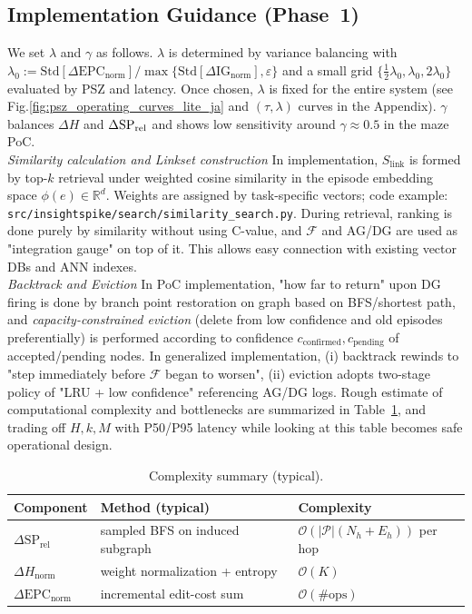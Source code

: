\documentclass[12pt]{article}
\newcommand{\F}{\mathcal{F}}
\newcommand{\gednorm}{\Delta\mathrm{EPC}_{\mathrm{norm}}}
\newcommand{\ignorm}{\Delta\mathrm{IG}_{\mathrm{norm}}}
\begin{document}
\subsection{Implementation Guidance (Phase~1)}
\noindent We set $\lambda$ and $\gamma$ as follows. $\lambda$ is determined by variance balancing with $\lambda_0:=\mathrm{Std}[\gednorm]/\max\{\mathrm{Std}[\ignorm],\varepsilon\}$ and a small grid $\{\tfrac{1}{2}\lambda_0,\lambda_0,2\lambda_0\}$ evaluated by PSZ and latency.
Once chosen, $\lambda$ is fixed for the entire system (see Fig.\ref{fig:psz_operating_curves_lite_ja} and $(\tau,\lambda)$ curves in the Appendix). $\gamma$ balances $\Delta H$ and $\Delta\mathrm{SP}_{\rm rel}$ and shows low sensitivity around $\gamma{\approx}0.5$ in the maze PoC.
\\
\noindent\textit{Similarity calculation and Linkset construction}\; In implementation, $S_{\mathrm{link}}$ is formed by top-$k$ retrieval under weighted cosine similarity in the episode embedding space $\phi(e)\in\mathbb{R}^d$. Weights are assigned by task-specific vectors; code example: \texttt{src/insightspike/search/\allowbreak similarity\_search.py}.
During retrieval, ranking is done purely by similarity without using C-value, and $\F$ and AG/DG are used as "integration gauge" on top of it.
This allows easy connection with existing vector DBs and ANN indexes.
\\
\noindent\textit{Backtrack and Eviction}\; In PoC implementation, "how far to return" upon DG firing is done by branch point restoration on graph based on BFS/shortest path, and \emph{capacity-constrained eviction} (delete from low confidence and old episodes preferentially) is performed according to confidence $c_{\mathrm{confirmed}},c_{\mathrm{pending}}$ of accepted/pending nodes.
In generalized implementation, (i) backtrack rewinds to "step immediately before $\F$ began to worsen", (ii) eviction adopts two-stage policy of "LRU + low confidence" referencing AG/DG logs.
Rough estimate of computational complexity and bottlenecks are summarized in Table~\ref{tab:complexity_summary}, and trading off $H,k,M$ with P50/P95 latency while looking at this table becomes safe operational design.

\begin{table}[H]
  \centering
  \small
  \caption{Complexity summary (typical).}
  \label{tab:complexity_summary}
  \begin{tabular}{@{}>{\raggedright\arraybackslash}p{3.8cm}>{\raggedright\arraybackslash}p{5.2cm}>{\raggedright\arraybackslash}p{5.6cm}@{}}
  \toprule
  Component & Method (typical) & Complexity \\
  \midrule
  $\Delta \mathrm{SP}_{\mathrm{rel}}$ & sampled BFS on induced subgraph & $\mathcal{O}(|\mathcal{P}|(N_h+E_h))$ per hop \\
  $\Delta H_{\mathrm{norm}}$ & weight normalization + entropy & $\mathcal{O}(K)$ \\
  $\gednorm$ & incremental edit-cost sum & $\mathcal{O}(\#\text{ops})$ \\
  \bottomrule
  \end{tabular}
\end{table}
\end{document}
